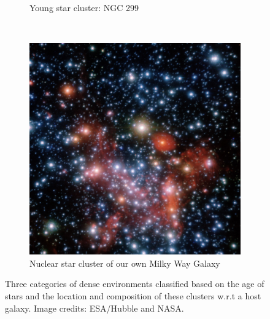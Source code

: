\begin{figure}
\begin{subfigure}[b]{0.48\textwidth}
  \caption{Young star cluster: NGC 299}
  \label{fig:YSC}
\end{subfigure}
\\
\begin{subfigure}[b]{0.48\textwidth}
  \centering
  \includegraphics[width=\linewidth]{figures/Introduction/NSC.jpg}
  \caption{Nuclear star cluster of our own Milky Way Galaxy}
  \label{fig:NSC}
\end{subfigure}
\caption{Three categories of dense environments classified based on the age of stars and the location and composition of these clusters w.r.t a host galaxy. Image credits: ESA/Hubble and NASA.}

\label{fig:Dense-environments}
\end{figure}

